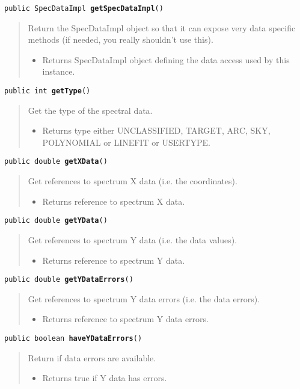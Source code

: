 \documentclass[twoside,11pt,nolof]{starlink}
\providecommand{\method}[1]{\texttt{#1}}
\newenvironment{desc}{\begin{quote}}{\end{quote}}
\begin{document}
\method{public SpecDataImpl \textbf{getSpecDataImpl}()\label{l71}\label{l72}}
\begin{desc}Return the SpecDataImpl object so that it can expose very data
 specific methods (if needed, you really shouldn't use this).
\begin{itemize}
\item{Returns SpecDataImpl object defining the data access used by
         this instance. }
\end{itemize}
\end{desc}

\method{public int \textbf{getType}()\label{l73}\label{l74}}
\begin{desc}Get the type of the spectral data.
\begin{itemize}
\item{Returns type either UNCLASSIFIED, TARGET, ARC, SKY, POLYNOMIAL or
                     LINEFIT or USERTYPE. }
\end{itemize}
\end{desc}

\method{public double \textbf{getXData}()\label{l75}\label{l76}}
\begin{desc}Get references to spectrum X data (i.e. the coordinates).
\begin{itemize}
\item{Returns reference to spectrum X data. }
\end{itemize}
\end{desc}

\method{public double \textbf{getYData}()\label{l77}\label{l78}}
\begin{desc}Get references to spectrum Y data (i.e. the data values).
\begin{itemize}
\item{Returns reference to spectrum Y data. }
\end{itemize}
\end{desc}

\method{public double \textbf{getYDataErrors}()\label{l79}\label{l80}}
\begin{desc}Get references to spectrum Y data errors (i.e. the data
 errors).
\begin{itemize}
\item{Returns reference to spectrum Y data errors. }
\end{itemize}
\end{desc}

\method{public boolean \textbf{haveYDataErrors}()\label{l81}\label{l82}}
\begin{desc}Return if data errors are available.
\begin{itemize}
\item{Returns true if Y data has errors. }
\end{itemize}
\end{desc}
\end{document}
